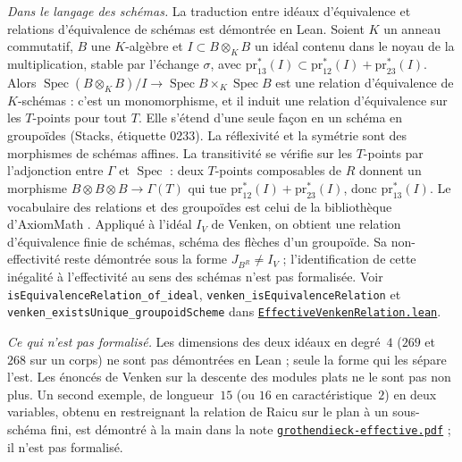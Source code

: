 \emph{Dans le langage des schémas.} La traduction entre idéaux d'équivalence et relations d'équivalence de schémas est démontrée en Lean. Soient $K$ un anneau commutatif, $B$ une $K$-algèbre et $I \subset B \otimes_K B$ un idéal contenu dans le noyau de la multiplication, stable par l'échange $\sigma$, avec $\mathrm{pr}_{13}^*(I) \subset \mathrm{pr}_{12}^*(I) + \mathrm{pr}_{23}^*(I)$. Alors $\operatorname{Spec}(B \otimes_K B)/I \to \operatorname{Spec} B \times_K \operatorname{Spec} B$ est une relation d'équivalence de $K$-schémas : c'est un monomorphisme, et il induit une relation d'équivalence sur les $T$-points pour tout $T$. Elle s'étend d'une seule façon en un schéma en groupoïdes (Stacks, étiquette 0233). La réflexivité et la symétrie sont des morphismes de schémas affines. La transitivité se vérifie sur les $T$-points par l'adjonction entre $\Gamma$ et $\operatorname{Spec}$ : deux $T$-points composables de $R$ donnent un morphisme $B \otimes B \otimes B \to \Gamma(T)$ qui tue $\mathrm{pr}_{12}^*(I) + \mathrm{pr}_{23}^*(I)$, donc $\mathrm{pr}_{13}^*(I)$. Le vocabulaire des relations et des groupoïdes est celui de la bibliothèque d'AxiomMath \cite{axiomstacks}. Appliqué à l'idéal $I_V$ de Venken, on obtient une relation d'équivalence finie de schémas, schéma des flèches d'un groupoïde. Sa non-effectivité reste démontrée sous la forme $J_{B^R} \neq I_V$ ; l'identification de cette inégalité à l'effectivité au sens des schémas n'est pas formalisée. Voir \texttt{isEquivalenceRelation\_of\_ideal}, \texttt{venken\_isEquivalenceRelation} et \texttt{venken\_existsUnique\_groupoidScheme} dans \href{\leanblobmain/AlgebraicGeometry/EffectiveVenkenRelation.lean}{\texttt{EffectiveVenkenRelation.\allowbreak{}lean}}.

\emph{Ce qui n'est pas formalisé.} Les dimensions des deux idéaux en degré~$4$ ($269$ et $268$ sur un corps) ne sont pas démontrées en Lean ; seule la forme qui les sépare l'est. Les énoncés de Venken sur la descente des modules plats ne le sont pas non plus. Un second exemple, de longueur~$15$ (ou $16$ en caractéristique~$2$) en deux variables, obtenu en restreignant la relation de Raicu sur le plan à un sous-schéma fini, est démontré à la main dans la note \href{https://grothendieck.commutator.io/article/grothendieck-effective.pdf}{\texttt{grothendieck-effective.pdf}} ; il n'est pas formalisé.
